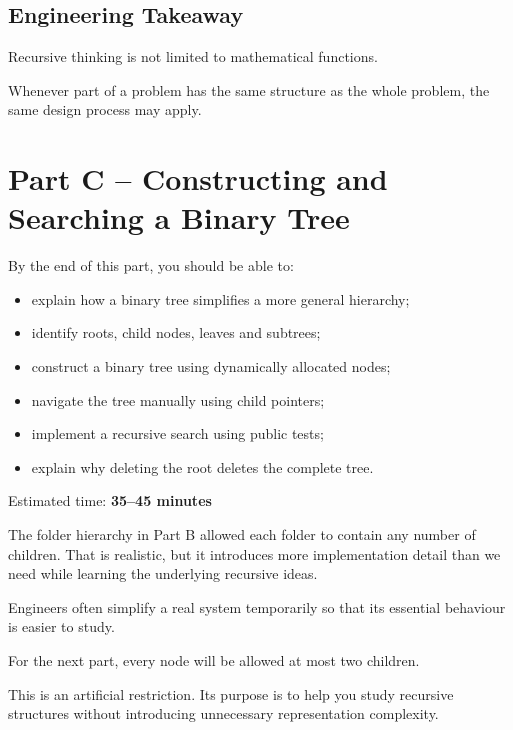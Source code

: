 \documentclass{csc2059practical}
\begin{document}
\subsection{Engineering Takeaway}

\begin{importantnote}
Recursive thinking is not limited to mathematical functions.

Whenever part of a problem has the same structure as the whole problem, the
same design process may apply.
\end{importantnote}


\section{Part C -- Constructing and Searching a Binary Tree}

\begin{learningoutcomes}
By the end of this part, you should be able to:

\begin{itemize}
    \item explain how a binary tree simplifies a more general hierarchy;
    \item identify roots, child nodes, leaves and subtrees;
    \item construct a binary tree using dynamically allocated nodes;
    \item navigate the tree manually using child pointers;
    \item implement a recursive search using public tests;
    \item explain why deleting the root deletes the complete tree.
\end{itemize}
\end{learningoutcomes}

\begin{infobox}
Estimated time: \textbf{35--45 minutes}
\end{infobox}

The folder hierarchy in Part B allowed each folder to contain any number of
children. That is realistic, but it introduces more implementation detail than
we need while learning the underlying recursive ideas.

Engineers often simplify a real system temporarily so that its essential
behaviour is easier to study.

\begin{infobox}
For the next part, every node will be allowed at most two children.

This is an artificial restriction. Its purpose is to help you study recursive
structures without introducing unnecessary representation complexity.
\end{infobox}
\end{document}
